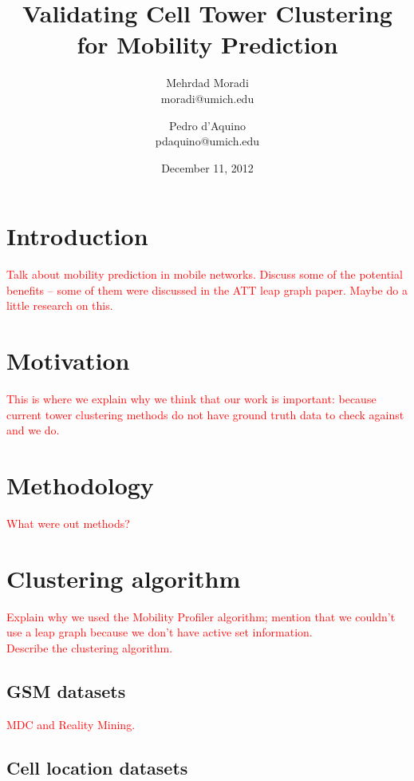 \documentclass[a4paper,12pt]{article}
\newcommand{\xxx}[1]{\textcolor{red}{#1}}
\begin{document}
\title{Validating Cell Tower Clustering for Mobility Prediction}
\author{Mehrdad Moradi\\moradi@umich.edu \and Pedro d'Aquino\\pdaquino@umich.edu}
\date{December 11, 2012}

\maketitle

\section{Introduction}

\xxx{Talk about mobility prediction in mobile networks. Discuss some of the potential benefits -- some of them were discussed in the
ATT leap graph paper. Maybe do a little research on this.}

\cite{Jadbabaie2012}
\cite{DeGroot1974}

\section{Motivation}

\xxx{This is where we explain why we think that our work is important: because current tower clustering methods do not have ground truth data to check against and we do.}

\section{Methodology}

\xxx{What were out methods?}

\section{Clustering algorithm}

\xxx{Explain why we used the Mobility Profiler algorithm; mention that we couldn't use a leap graph because we don't have active set information.
\\Describe the clustering algorithm.}

\subsection{GSM datasets}

\xxx{MDC and Reality Mining.}

\subsection{Cell location datasets}
\end{document}
